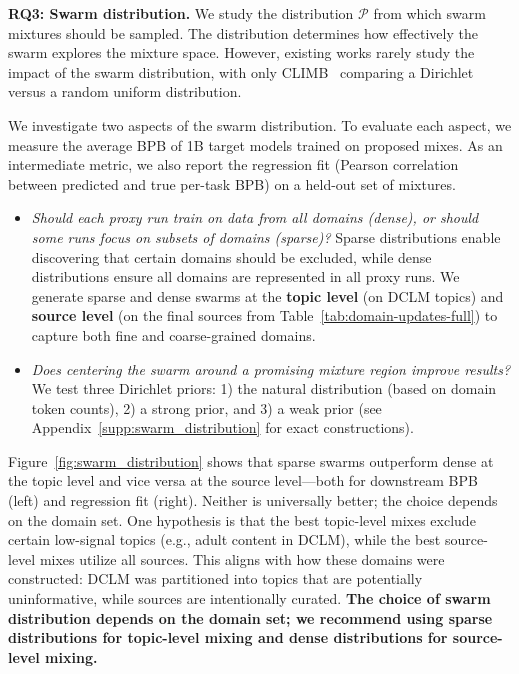 \documentclass[table]{ai2style/ai2}
\begin{document}
\textbf{RQ3: Swarm distribution.} We study the distribution $\mathcal{P}$ from which swarm mixtures should be sampled. The distribution determines how effectively the swarm explores the mixture space. However, existing works rarely study the impact of the swarm distribution, with only CLIMB~\citep{diao2025climbclusteringbasediterativedata} comparing a Dirichlet versus a random uniform distribution. 

We investigate two aspects of the swarm distribution. To evaluate each aspect, we measure the average BPB of 1B target models trained on proposed mixes. As an intermediate metric, we also report the regression fit (Pearson correlation between predicted and true per-task BPB) on a held-out set of mixtures. 
\begin{itemize}
    \item \textit{Should each proxy run train on data from all domains (dense), or should some runs focus on subsets of domains (sparse)?} Sparse distributions enable discovering that certain domains should be excluded, while dense distributions ensure all domains are represented in all proxy runs. We generate sparse and dense swarms at the \textbf{topic level} (on DCLM topics) and \textbf{source level} (on the final sources from Table~\ref{tab:domain-updates-full}) to capture both fine and coarse-grained domains.
    
    \item \textit{Does centering the swarm around a promising mixture region improve results?} We test three Dirichlet priors: 1) the natural distribution (based on domain token counts), 2) a strong prior, and 3) a weak prior (see Appendix~\ref{supp:swarm_distribution} for exact constructions).
    
\end{itemize}

Figure~\ref{fig:swarm_distribution} shows that sparse swarms outperform dense at the topic level and vice versa at the source level—both for downstream BPB (left) and regression fit (right).
Neither is universally better; the choice depends on the domain set.
One hypothesis is that the best topic-level mixes exclude certain low-signal topics (e.g., adult content in DCLM), while the best source-level mixes utilize all sources. This aligns with how these domains were constructed: DCLM was partitioned into topics that are potentially uninformative, while sources are intentionally curated. \textbf{The choice of swarm distribution depends on the domain set; we recommend using sparse distributions for topic-level mixing and dense distributions for source-level mixing.}
\end{document}
